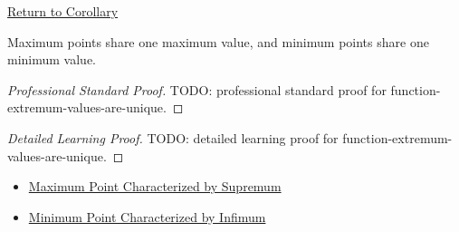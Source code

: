 \newpage
{}
\label{prf:function-extremum-values-are-unique}

\begin{remark*}[Return]
\hyperref[cor:function-extremum-values-are-unique]{Return to Corollary}
\end{remark*}

\begin{corollary*}
Maximum points share one maximum value, and minimum points share one minimum value.
\end{corollary*}

\begin{proof}[Professional Standard Proof]
\LRAProofBodyStart
TODO: professional standard proof for function-extremum-values-are-unique.
\end{proof}

\begin{proof}[Detailed Learning Proof]
\LRAProofBodyStart
TODO: detailed learning proof for function-extremum-values-are-unique.
\end{proof}

\begin{remark*}
\end{remark*}

\begin{dependencies}
\begin{itemize}
  \item \hyperref[prop:maximum-point-characterized-by-supremum]{Maximum Point Characterized by Supremum}
  \item \hyperref[prop:minimum-point-characterized-by-infimum]{Minimum Point Characterized by Infimum}
\end{itemize}
\end{dependencies}

\clearpage
